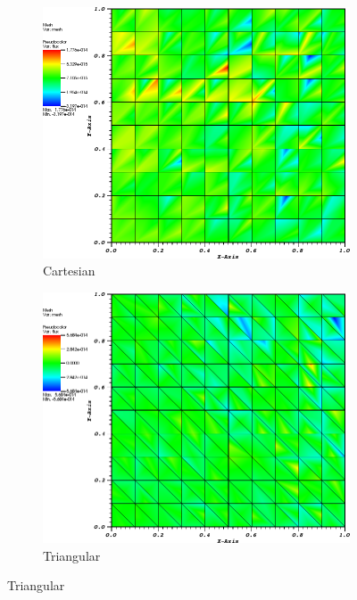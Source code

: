\begin{figure}
\centering
{
	\begin{subfigure}[b]{0.465\textwidth}
		\centering
		\label{subfig::cart_me_k2_lin_sol}
		\includegraphics[width=\textwidth]{figures/sec_BF/quad_err_cart_Wach2.png}
		\caption{Cartesian}
	\end{subfigure}
	\hfill
	\begin{subfigure}[b]{0.465\textwidth}
		\centering
		\label{subfig::tri_me_k2_lin_sol}
		\includegraphics[width=\textwidth]{figures/sec_BF/quad_err_tri_Wach2.png}
		\caption{Triangular}

\end{subfigure}}
\end{figure}

